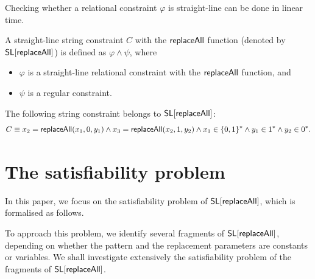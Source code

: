 \begin{remark}
Checking whether a relational constraint $\varphi$ is straight-line can be done in linear time. 
\end{remark}

\begin{definition}
	A straight-line string constraint $C$ with the $\mathsf{replaceAll}$ function (denoted by $\mathsf{SL}[\mathsf{replaceAll}]$)  is defined as $ \varphi \wedge \psi$,  where 
	\begin{itemize}
		\item $\varphi$ is a straight-line relational constraint with the $\mathsf{replaceAll}$ function,  and
		\item $\psi$ is a regular constraint.
	\end{itemize}
\end{definition}



\begin{example}
The following string constraint belongs to $\mathsf{SL}[\mathsf{replaceAll}]$: 
$$C \equiv x_2 = \mathsf{replaceAll}(x_1, 0, y_1) \wedge x_3 = \mathsf{replaceAll}(x_2, 1, y_2) \wedge x_1 \in \{0,1\}^* \wedge y_1 \in 1^* \wedge y_2 \in 0^*.$$
\end{example}




\section{The satisfiability problem} \label{sec-sat}
In this paper, we focus on the satisfiability problem of $\mathsf{SL}[\mathsf{replaceAll}]$, which is formalised as follows. 

\smallskip

\begin{quote} \centering
{}
\end{quote}
\smallskip

To approach this problem, we identify several fragments of  $\mathsf{SL}[\mathsf{replaceAll}]$, depending on whether the pattern and the replacement parameters are constants or variables.  We shall investigate extensively the satisfiability problem of the fragments of $\mathsf{SL}[\mathsf{replaceAll}]$. %


